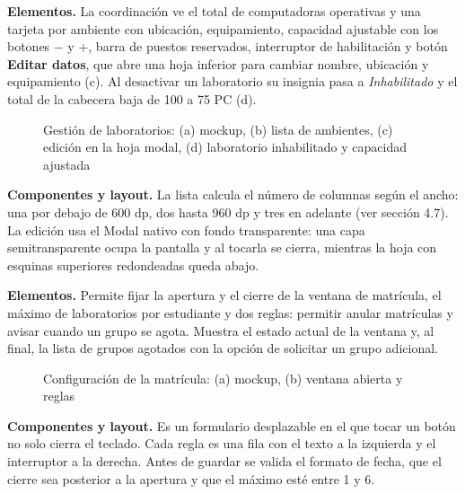 
\textbf{Elementos.} La coordinación ve el total de computadoras operativas y una tarjeta por ambiente con ubicación, equipamiento, capacidad ajustable con los botones − y +, barra de puestos reservados, interruptor de habilitación y botón \textbf{Editar datos}, que abre una hoja inferior para cambiar nombre, ubicación y equipamiento (c). Al desactivar un laboratorio su insignia pasa a \textit{Inhabilitado} y el total de la cabecera baja de 100 a 75 PC (d).

\begin{figure}[!htbp]
\centering
{}
\caption{Gestión de laboratorios: (a) mockup, (b) lista de ambientes, (c) edición en la hoja modal, (d) laboratorio inhabilitado y capacidad ajustada}
\label{fig:i10}
\end{figure}

\textbf{Componentes y layout.} La lista calcula el número de columnas según el ancho: una por debajo de 600 dp, dos hasta 960 dp y tres en adelante (ver sección 4.7). La edición usa el Modal nativo con fondo transparente: una capa semitransparente ocupa la pantalla y al tocarla se cierra, mientras la hoja con esquinas superiores redondeadas queda abajo.


\textbf{Elementos.} Permite fijar la apertura y el cierre de la ventana de matrícula, el máximo de laboratorios por estudiante y dos reglas: permitir anular matrículas y avisar cuando un grupo se agota. Muestra el estado actual de la ventana y, al final, la lista de grupos agotados con la opción de solicitar un grupo adicional.

\begin{figure}[!htbp]
\centering
{}
\caption{Configuración de la matrícula: (a) mockup, (b) ventana abierta y reglas}
\label{fig:i11}
\end{figure}

\textbf{Componentes y layout.} Es un formulario desplazable en el que tocar un botón no solo cierra el teclado. Cada regla es una fila con el texto a la izquierda y el interruptor a la derecha. Antes de guardar se valida el formato de fecha, que el cierre sea posterior a la apertura y que el máximo esté entre 1 y 6.

